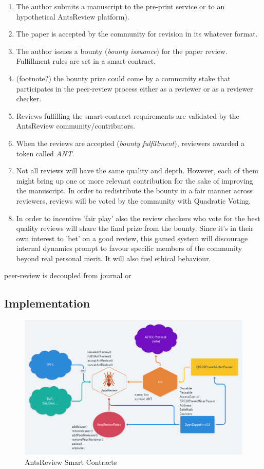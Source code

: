 \documentclass[runningheads]{llncs}
\begin{document}
\begin{enumerate}
    \item The author submits a manuscript to the pre-print service or to an hypothetical AntsReview platform).
    \item The paper is accepted by the community for revision in its whatever format.
    \item The author issues a bounty (\emph{bounty issuance}) for the paper review. Fulfillment rules are set in a smart-contract.
    \item (footnote?) the bounty prize could come by a community stake that participates in the peer-review process either as a reviewer or as a reviewer checker.
    \item Reviews fulfilling the smart-contract requirements are validated by the AntsReview community/contributors.
    \item When the reviews are accepted (\emph{bounty fulfillment}), reviewers awarded a token called \emph{ANT}.
    \item Not all reviews will have the same quality and depth. However, each of them might bring up one or more relevant contribution for the sake of improving the manuscript. In order to redistribute the bounty in a fair manner across reviewers, reviews will be voted by the community with Quadratic Voting.
    \item In order to incentive 'fair play' also the review checkers who vote for the best quality reviews will share the final prize from the bounty. Since it's in their own interest to 'bet' on a good review, this gamed system will discourage internal dynamics prompt to favour specific members of the community beyond real personal merit. It will also fuel ethical behaviour.

    \end{enumerate}

peer-review is decoupled from journal
or


\subsection{Implementation}

\begin{figure}
\centering
\includegraphics[scale=0.28]{AntsReview}
\caption{AntsReview Smart Contracts}
\label{fig:contracts}
\end{figure}
\end{document}
